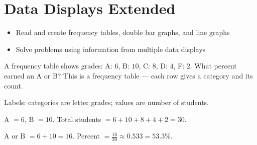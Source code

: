 \section{Data Displays Extended}

\begin{stepGoal}
\begin{itemize}
    \item Read and create frequency tables, double bar graphs, and line graphs
    \item Solve problems using information from multiple data displays
\end{itemize}
\end{stepGoal}

\begin{stepVocabBox}
\end{stepVocabBox}

\begin{stepsCard}
\end{stepsCard}

\begin{stepExample}{A frequency table shows grades: A: $6$, B: $10$, C: $8$, D: $4$, F: $2$. What percent earned an A or B?}
     This is a frequency table — each row gives a category and its count.

     Labels: categories are letter grades; values are number of students.

     A $= 6$, B $= 10$. Total students $= 6 + 10 + 8 + 4 + 2 = 30$.

     A or B $= 6 + 10 = 16$. Percent $= \frac{16}{30} \approx 0.533 = 53.3\%$.
\end{stepExample}

